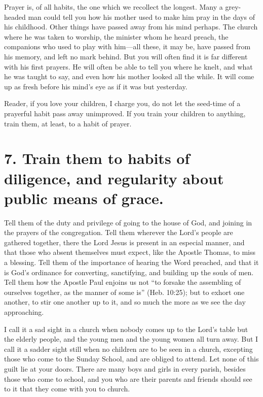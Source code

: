 \documentclass[
]{book}
\begin{document}
Prayer is, of all habits, the one which we recollect the longest. Many a grey-headed man could tell you how his mother used to make him pray in the days of his childhood. Other things have passed away from his mind perhaps. The church where he was taken to worship, the minister whom he heard preach, the companions who used to play with him---all these, it may be, have passed from his memory, and left no mark behind. But you will often find it is far different with his first prayers. He will often be able to tell you where he knelt, and what he was taught to say, and even how his mother looked all the while. It will come up as fresh before his mind's eye as if it was but yesterday.

Reader, if you love your children, I charge you, do not let the seed-time of a prayerful habit pass away unimproved. If you train your children to anything, train them, at least, to a habit of prayer.

\hypertarget{train-them-to-habits-of-diligence-and-regularity-about-public-means-of-grace.}{%
\section*{7. Train them to habits of diligence, and regularity about public means of grace.}\label{train-them-to-habits-of-diligence-and-regularity-about-public-means-of-grace.}}

Tell them of the duty and privilege of going to the house of God, and joining in the prayers of the congregation. Tell them wherever the Lord's people are gathered together, there the Lord Jesus is present in an especial manner, and that those who absent themselves must expect, like the Apostle Thomas, to miss a blessing. Tell them of the importance of hearing the Word preached, and that it is God's ordinance for converting, sanctifying, and building up the souls of men. Tell them how the Apostle Paul enjoins us not ``to forsake the assembling of ourselves together, as the manner of some is'' (Heb. 10:25); but to exhort one another, to stir one another up to it, and so much the more as we see the day approaching.

I call it a sad sight in a church when nobody comes up to the Lord's table but the elderly people, and the young men and the young women all turn away. But I call it a sadder sight still when no children are to be seen in a church, excepting those who come to the Sunday School, and are obliged to attend. Let none of this guilt lie at your doors. There are many boys and girls in every parish, besides those who come to school, and you who are their parents and friends should see to it that they come with you to church.
\end{document}
